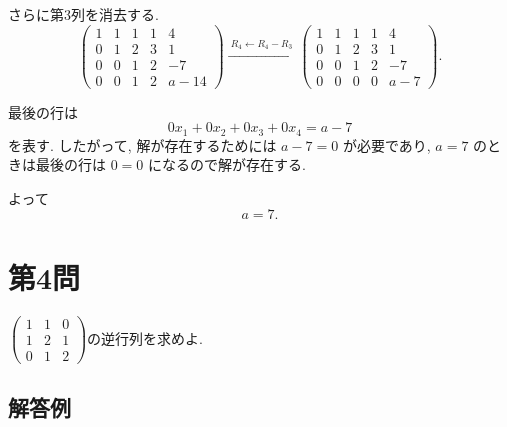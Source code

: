 \documentclass[uplatex,dvipdfmx,a4paper,14pt]{jsarticle}
\newcommand{\op}[1]{\xrightarrow{\ #1\ }}
\begin{document}
さらに第3列を消去する.
\[
\left(
\begin{array}{cccc|c}
1&1&1&1&4\\
0&1&2&3&1\\
0&0&1&2&-7\\
0&0&1&2&a-14
\end{array}
\right)
\op{R_4\leftarrow R_4-R_3}
\left(
\begin{array}{cccc|c}
1&1&1&1&4\\
0&1&2&3&1\\
0&0&1&2&-7\\
0&0&0&0&a-7
\end{array}
\right).
\]

最後の行は
\[
0x_1+0x_2+0x_3+0x_4=a-7
\]
を表す. したがって, 解が存在するためには $a-7=0$ が必要であり, $a=7$ のときは最後の行は $0=0$ になるので解が存在する.

よって
\[
\boxed{a=7.}
\]

\section*{第4問}

\begin{tcolorbox}[problemstyle,title=問題]

$
 \begin{pmatrix}
 1&1&0\\
 1&2&1\\
 0&1&2
 \end{pmatrix}
 $の逆行列を求めよ.

\end{tcolorbox}

\subsection*{解答例}
\end{document}
